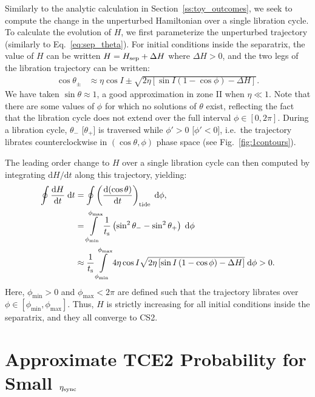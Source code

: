 \documentclass[
        fleqn,
        usenatbib,
    ]{mnras}
\newcommand*{\rd}[2]{\frac{\mathrm{d}#1}{\mathrm{d}#2}}
\newcommand*{\rdil}[2]{\mathrm{d}#1/\mathrm{d}#2}
\newcommand*{\p}[1]{\left(#1\right)}
\newcommand*{\s}[1]{\left[#1\right]}
\begin{document}
Similarly to the analytic calculation in Section~\ref{ss:toy_outcomes}, we seek
to compute the change in the unperturbed Hamiltonian over a single libration
cycle. To calculate the evolution of $H$, we first parameterize the unperturbed
trajectory (similarly to Eq.~\ref{eq:sep_theta}). For initial conditions inside
the separatrix, the value of $H$ can be written $H = H_{\rm sep} + \Delta H$
where $\Delta H > 0$, and the two legs of the libration trajectory can be
written:
\begin{align}
    \cos \theta_{\pm} &\approx
        \eta \cos I \pm \sqrt{2\eta\s{\sin I\p{1 - \cos \phi} - \Delta H}}.
        \label{eq:lib_cycle_toy}
\end{align}
We have taken $\sin \theta \approx 1$, a good approximation in zone II when
$\eta \ll 1$. Note that there are some values of $\phi$ for which no solutions
of $\theta$ exist, reflecting the fact that the libration cycle does not extend
over the full interval $\phi \in [0, 2\pi]$. During a libration cycle,
$\theta_-$ [$\theta_+$] is traversed while $\phi' > 0$ [$\phi' < 0$], i.e.\ the
trajectory librates counterclockwise in $(\cos \theta, \phi)$ phase space (see
Fig.~\ref{fig:1contours}).

The leading order change to $H$ over a single libration cycle can then computed by
integrating $\rdil{H}{t}$ along this trajectory, yielding:
\begin{align}
    \oint \rd{H}{t}\;\mathrm{d}t
        &= \oint \p{\rd{(\cos \theta)}{t}}_{\rm tide}
            \;\mathrm{d}\phi,\nonumber\\
        &= \int\limits_{\phi_{\min}}^{\phi_{\max}}
                \frac{1}{t_{\rm s}}
                \p{\sin^2\theta_- - \sin^2\theta_+} \;\mathrm{d}\phi\nonumber\\
        &\approx \frac{1}{t_{\rm s}}
            \int\limits_{\phi_{\min}}^{\phi_{\max}}
                4\eta \cos I \sqrt{2\eta\s{\sin I\p{1 - \cos \phi} - \Delta H}}
                \;\mathrm{d}\phi > 0.
\end{align}
Here, $\phi_{\min} > 0$ and $\phi_{\max} < 2\pi$ are defined such that the
trajectory librates over $\phi \in \s{\phi_{\min}, \phi_{\max}}$. Thus, $H$ is
strictly increasing for all initial conditions inside the separatrix, and they
all converge to CS2.

\section{Approximate TCE2 Probability for Small $\eta_{\rm sync}$
}\label{app:sep_crossing_dynamics}
\end{document}
